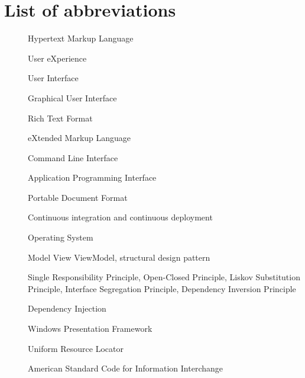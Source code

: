 \chapter*{List of abbreviations}

\begin{multicols}{2}
    \raggedright
    \begin{description}
        \item [] Hypertext Markup Language
        \item [] User eXperience
        \item [] User Interface
        \item [] Graphical User Interface
        \item [] Rich Text Format
        \item [] eXtended Markup Language
        \item [] Command Line Interface
        \item [] Application Programming Interface
        \item [] Portable Document Format
        \item [] Continuous integration and continuous deployment
        \item [] Operating System
        \item [] Model View ViewModel, structural design pattern
        \item [] Single Responsibility Principle, Open-Closed Principle, Liskov Substitution Principle, Interface Segregation Principle, Dependency Inversion Principle
        \item [] Dependency Injection
        \item [] Windows Presentation Framework
        \item [] Uniform Resource Locator
        \item [] American Standard Code for Information Interchange
    \end{description}
\end{multicols}

